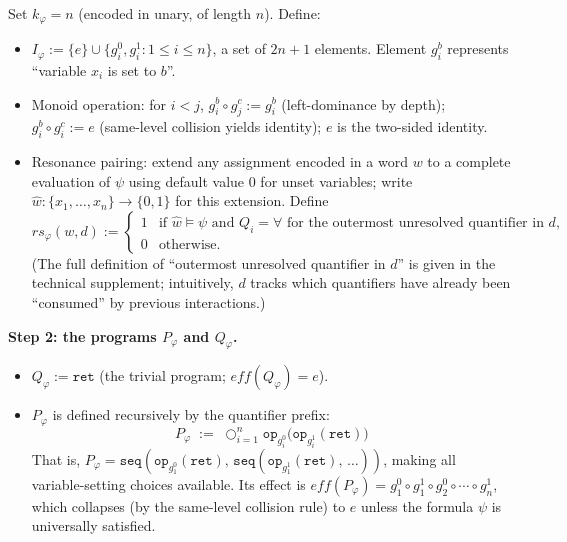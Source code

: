 Set $k_\varphi = n$ (encoded in unary, of length $n$).  Define:
\begin{itemize}
\item
  $I_\varphi := \{e\} \cup \{g_i^0, g_i^1 : 1\le i\le n\}$,
  a set of $2n+1$ elements.  Element $g_i^b$ represents
  ``variable $x_i$ is set to $b$''.

\item
  Monoid operation: for $i<j$,
  $g_i^b \circ g_j^c := g_i^b$ (left-dominance by depth);
  $g_i^b \circ g_i^c := e$ (same-level collision yields identity);
  $e$ is the two-sided identity.

\item
  Resonance pairing: extend any assignment encoded in a word $w$
  to a complete evaluation of $\psi$ using default value $0$ for
  unset variables; write $\hat{w}:\{x_1,\ldots,x_n\}\to\{0,1\}$
  for this extension.  Define
  \[
    \mathit{rs}_\varphi(w, d) :=
    \begin{cases}
      1 & \text{if } \hat{w}\models\psi \text{ and }
                     Q_i = \forall \text{ for the outermost
                     unresolved quantifier in } d, \\
      0 & \text{otherwise.}
    \end{cases}
  \]
  (The full definition of ``outermost unresolved quantifier in $d$''
  is given in the technical supplement; intuitively, $d$ tracks
  which quantifiers have already been ``consumed'' by previous
  interactions.)
\end{itemize}

\medskip\noindent
\textbf{Step 2: the programs $P_\varphi$ and $Q_\varphi$.}

\begin{itemize}
\item
  $Q_\varphi := \mathtt{ret}$ (the trivial program; $\mathit{eff}(Q_\varphi)=e$).

\item
  $P_\varphi$ is defined recursively by the quantifier prefix:
  \[
    P_\varphi \;:=\;
    \bigcirc_{i=1}^{n}
    \mathtt{op}_{g_i^0} \bigl(\mathtt{op}_{g_i^1}(\mathtt{ret})\bigr)
  \]
  That is, $P_\varphi = \mathtt{seq}(
    \mathtt{op}_{g_1^0}(\mathtt{ret}),\,
    \mathtt{seq}(\mathtt{op}_{g_1^1}(\mathtt{ret}),\,\ldots))$,
  making all variable-setting choices available.
  Its effect is
  $\mathit{eff}(P_\varphi) = g_1^0 \circ g_1^1 \circ g_2^0 \circ \cdots
  \circ g_n^1$,
  which collapses (by the same-level collision rule) to $e$
  unless the formula $\psi$ is universally satisfied.
\end{itemize}


